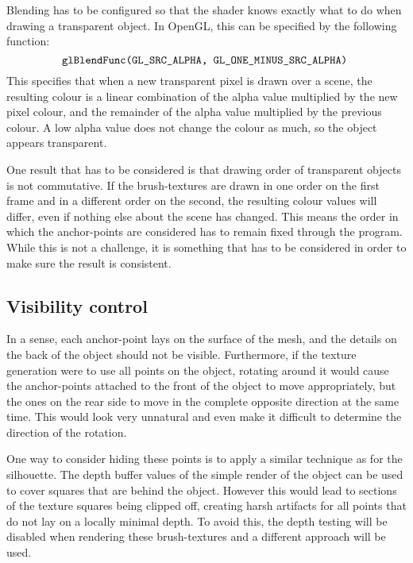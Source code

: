 \documentclass[a4paper,10pt]{article}
\begin{document}
Blending has to be configured so that the shader knows exactly what to do when drawing a transparent object. In OpenGL, this can be specified by the following function:
$$\texttt{glBlendFunc(GL\_SRC\_ALPHA, GL\_ONE\_MINUS\_SRC\_ALPHA)\;}$$
This specifies that when a new transparent pixel is drawn over a scene, the resulting colour is a linear combination of the alpha value multiplied by the new pixel colour, and the remainder of the alpha value multiplied by the previous colour. A low alpha value does not change the colour as much, so the object appears transparent.

One result that has to be considered is that drawing order of transparent objects is not commutative. If the brush-textures are drawn in one order on the first frame and in a different order on the second, the resulting colour values will differ, even if nothing else about the scene has changed. This means the order in which the anchor-points are considered has to remain fixed through the program. While this is not a challenge, it is something that has to be considered in order to make sure the result is consistent.


\subsection{Visibility control}
In a sense, each anchor-point lays on the surface of the mesh, and the details on the back of the object should not be visible. Furthermore, if the texture generation were to use all points on the object, rotating around it would cause the anchor-points attached to the front of the object to move appropriately, but the ones on the rear side to move in the complete opposite direction at the same time. This would look very unnatural and even make it difficult to determine the direction of the rotation.

One way to consider hiding these points is to apply a similar technique as for the silhouette. The depth buffer values of the simple render of the object can be used to cover squares that are behind the object. However this would lead to sections of the texture squares being clipped off, creating harsh artifacts for all points that do not lay on a locally minimal depth. To avoid this, the depth testing will be disabled when rendering these brush-textures and a different approach will be used.
\end{document}
